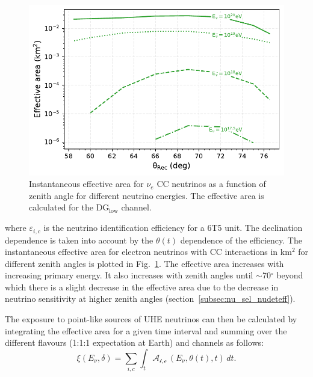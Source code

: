 \begin{figure}[t!]
  \centering
  \includegraphics[width=14.5cm]{thesis_figures/PointLimits/EffArea_vs_Theta_CC_optim.pdf}
  \caption{Instantaneous effective area for $\nu_e$ CC neutrinos as a function of zenith angle for different neutrino energies. The effective area is calculated for the DG$\mathrm{_{\text{low}}}$ channel.}
  \label{fig:Eff_Area}
\end{figure}


where $\varepsilon_{i,c}$ is the neutrino identification efficiency for a 6T5 unit. The declination dependence is taken into account by the $\theta(t)$ dependence of the efficiency. The instantaneous effective area for electron neutrinos with CC interactions in km$^2$ for different zenith angles is plotted in Fig.~\ref{fig:Eff_Area}. The effective area increases with increasing primary energy. It also increases with zenith angles until $\sim$70$^\circ$ beyond which there is a slight decrease in the effective area due to the decrease in neutrino sensitivity at higher zenith angles (section~\ref{subsec:nu_sel_nudeteff}). 

The exposure to point-like sources of UHE neutrinos can then be calculated by integrating the effective area for a given time interval and summing over the different flavours (1:1:1 expectation at Earth) and channels as follows:
\begin{equation}
  \label{eq:exposure_point}
  \xi(E_{\nu}, \delta) = \sum_{i,c} \int_{t} \mathcal{A_{i,c}} \, (E_{\nu},\theta(t),t) \, dt.
\end{equation}


